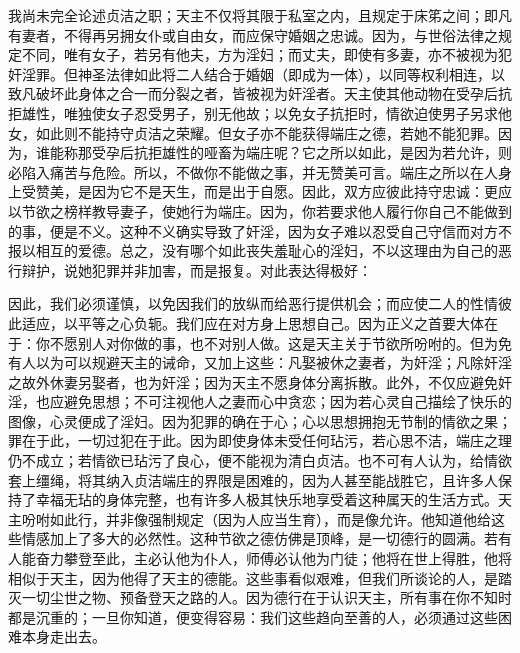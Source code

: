 我尚未完全论述贞洁之职；天主不仅将其限于私室之内，且规定于床笫之间；即凡有妻者，不得再另拥女仆或自由女，而应保守婚姻之忠诚。因为，与世俗法律之规定不同，唯有女子，若另有他夫，方为淫妇；而丈夫，即使有多妻，亦不被视为犯奸淫罪。但神圣法律如此将二人结合于婚姻（即成为一体），以同等权利相连，以致凡破坏此身体之合一而分裂之者，皆被视为奸淫者。天主使其他动物在受孕后抗拒雄性，唯独使女子忍受男子，别无他故；以免女子抗拒时，情欲迫使男子另求他女，如此则不能持守贞洁之荣耀。但女子亦不能获得端庄之德，若她不能犯罪。因为，谁能称那受孕后抗拒雄性的哑畜为端庄呢？它之所以如此，是因为若允许，则必陷入痛苦与危险。所以，不做你不能做之事，并无赞美可言。端庄之所以在人身上受赞美，是因为它不是天生，而是出于自愿。因此，双方应彼此持守忠诚：更应以节欲之榜样教导妻子，使她行为端庄。因为，你若要求他人履行你自己不能做到的事，便是不义。这种不义确实导致了奸淫，因为女子难以忍受自己守信而对方不报以相互的爱德。总之，没有哪个如此丧失羞耻心的淫妇，不以这理由为自己的恶行辩护，说她犯罪并非加害，而是报复。对此表达得极好：\par

因此，我们必须谨慎，以免因我们的放纵而给恶行提供机会；而应使二人的性情彼此适应，以平等之心负轭。我们应在对方身上思想自己。因为正义之首要大体在于：你不愿别人对你做的事，也不对别人做。这是天主关于节欲所吩咐的。但为免有人以为可以规避天主的诫命，又加上这些：凡娶被休之妻者，为奸淫；凡除奸淫之故外休妻另娶者，也为奸淫；因为天主不愿身体分离拆散。此外，不仅应避免奸淫，也应避免思想；不可注视他人之妻而心中贪恋；因为若心灵自己描绘了快乐的图像，心灵便成了淫妇。因为犯罪的确在于心；心以思想拥抱无节制的情欲之果；罪在于此，一切过犯在于此。因为即使身体未受任何玷污，若心思不洁，端庄之理仍不成立；若情欲已玷污了良心，便不能视为清白贞洁。也不可有人认为，给情欲套上缰绳，将其纳入贞洁端庄的界限是困难的，因为人甚至能战胜它，且许多人保持了幸福无玷的身体完整，也有许多人极其快乐地享受着这种属天的生活方式。天主吩咐如此行，并非像强制规定（因为人应当生育），而是像允许。他知道他给这些情感加上了多大的必然性。这种节欲之德仿佛是顶峰，是一切德行的圆满。若有人能奋力攀登至此，主必认他为仆人，师傅必认他为门徒；他将在世上得胜，他将相似于天主，因为他得了天主的德能。这些事看似艰难，但我们所谈论的人，是踏灭一切尘世之物、预备登天之路的人。因为德行在于认识天主，所有事在你不知时都是沉重的；一旦你知道，便变得容易：我们这些趋向至善的人，必须通过这些困难本身走出去。\par

